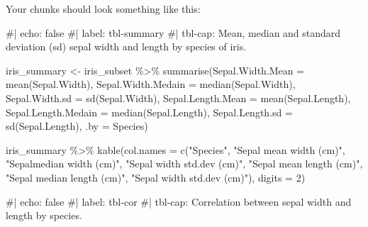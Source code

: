 \documentclass[
  letterpaper,
  DIV=11,
  numbers=noendperiod]{scrartcl}
\newenvironment{Shaded}{\begin{snugshade}}{\end{snugshade}}
\newcommand{\AttributeTok}[1]{\textcolor[rgb]{0.40,0.45,0.13}{#1}}
\newcommand{\CommentTok}[1]{\textcolor[rgb]{0.37,0.37,0.37}{#1}}
\newcommand{\DecValTok}[1]{\textcolor[rgb]{0.68,0.00,0.00}{#1}}
\newcommand{\FunctionTok}[1]{\textcolor[rgb]{0.28,0.35,0.67}{#1}}
\newcommand{\NormalTok}[1]{\textcolor[rgb]{0.00,0.23,0.31}{#1}}
\newcommand{\OtherTok}[1]{\textcolor[rgb]{0.00,0.23,0.31}{#1}}
\newcommand{\SpecialCharTok}[1]{\textcolor[rgb]{0.37,0.37,0.37}{#1}}
\newcommand{\StringTok}[1]{\textcolor[rgb]{0.13,0.47,0.30}{#1}}
\begin{document}
\begin{tcolorbox}
Your chunks should look something like this:

\begin{Shaded}
\begin{Highlighting}[]
\CommentTok{\#| echo: false}
\CommentTok{\#| label: tbl{-}summary}
\CommentTok{\#| tbl{-}cap:  Mean, median and standard deviation (sd) sepal width and length by species of iris.}

\NormalTok{iris\_summary }\OtherTok{\textless{}{-}}\NormalTok{ iris\_subset }\SpecialCharTok{\%\textgreater{}\%}
   \FunctionTok{summarise}\NormalTok{(}\StringTok{\textquotesingle{}Sepal.Width.Mean\textquotesingle{}} \OtherTok{=} \FunctionTok{mean}\NormalTok{(Sepal.Width),}
             \StringTok{\textquotesingle{}Sepal.Width.Medain\textquotesingle{}} \OtherTok{=} \FunctionTok{median}\NormalTok{(Sepal.Width),}
             \StringTok{\textquotesingle{}Sepal.Width.sd\textquotesingle{}} \OtherTok{=} \FunctionTok{sd}\NormalTok{(Sepal.Width),}
             \StringTok{\textquotesingle{}Sepal.Length.Mean\textquotesingle{}} \OtherTok{=} \FunctionTok{mean}\NormalTok{(Sepal.Length),}
             \StringTok{\textquotesingle{}Sepal.Length.Medain\textquotesingle{}} \OtherTok{=} \FunctionTok{median}\NormalTok{(Sepal.Length),}
             \StringTok{\textquotesingle{}Sepal.Length.sd\textquotesingle{}} \OtherTok{=} \FunctionTok{sd}\NormalTok{(Sepal.Length),}
             \AttributeTok{.by =}\NormalTok{ Species) }

\NormalTok{iris\_summary }\SpecialCharTok{\%\textgreater{}\%}
  \FunctionTok{kable}\NormalTok{(}\AttributeTok{col.names =} \FunctionTok{c}\NormalTok{(}\StringTok{"Species"}\NormalTok{,}
                      \StringTok{"Sepal mean width (cm)"}\NormalTok{,}
                      \StringTok{"Sepalmedian width (cm)"}\NormalTok{,}
                      \StringTok{"Sepal width std.dev (cm)"}\NormalTok{,}
                      \StringTok{"Sepal mean length (cm)"}\NormalTok{,}
                      \StringTok{"Sepal median length (cm)"}\NormalTok{,}
                      \StringTok{"Sepal width std.dev (cm)"}\NormalTok{),}
        \AttributeTok{digits =} \DecValTok{2}\NormalTok{)}
\end{Highlighting}
\end{Shaded}

\begin{Shaded}
\begin{Highlighting}[]
\CommentTok{\#| echo: false}
\CommentTok{\#| label: tbl{-}cor}
\CommentTok{\#| tbl{-}cap: Correlation between sepal width and length by species.}


\end{Highlighting}
\end{Shaded}
\end{tcolorbox}
\end{document}
